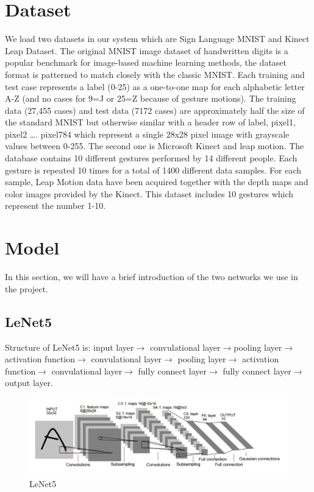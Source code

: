 \documentclass[12pt]{article}
\begin{document}
\section{Dataset}

We load two datasets in our system  which are Sign Language MNIST and Kinect Leap Dataset. The original MNIST image dataset of handwritten digits is a popular benchmark for image-based machine learning methods, the dataset format is patterned to match closely with the classic MNIST. Each training and test case represents a label (0-25) as a one-to-one map for each alphabetic letter A-Z (and no cases for 9=J or 25=Z because of gesture motions). The training data (27,455 cases) and test data (7172 cases) are approximately half the size of the standard MNIST but otherwise similar with a header row of label, pixel1, pixel2 …. pixel784 which represent a single 28x28 pixel image with grayscale values between 0-255. The second one is Microsoft Kinect and leap motion. The database contains 10 different gestures performed by 14 different people. Each gesture is repeated 10 times for a total of 1400 different data samples. For each sample, Leap Motion data have been acquired together with the depth maps and color images provided by the Kinect. This dataset includes 10 gestures which represent the number 1-10.
\section{Model}
In this section, we will have a brief introduction of the two networks we use in the project.

\subsection{LeNet5}
Structure of LeNet5 is: input layer$\rightarrow$ convulational layer$\rightarrow$pooling layer$\rightarrow$ activation function$\rightarrow$ convulational layer$\rightarrow$ pooling layer$\rightarrow$ activation function$\rightarrow$ convulational layer$\rightarrow$ fully connect layer$\rightarrow$ fully connect layer$\rightarrow$ output layer.

\begin{figure}[H]
    \centering
    \includegraphics[scale=0.9]{modelpic/LeNet.png}
    \caption{LeNet5}
\end{figure}
\end{document}
